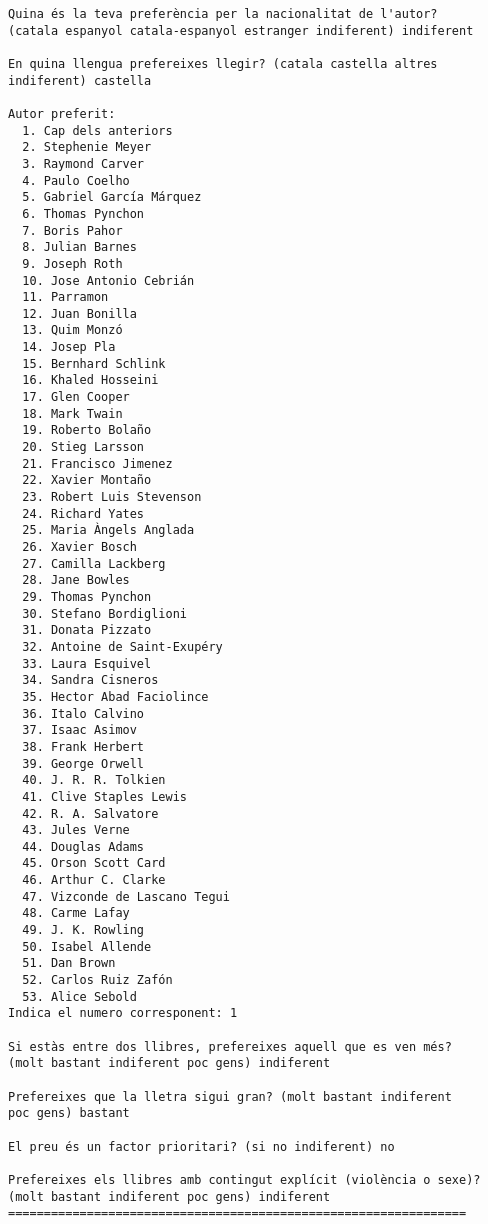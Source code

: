\begin{verbatim}
Quina és la teva preferència per la nacionalitat de l'autor?
(catala espanyol catala-espanyol estranger indiferent) indiferent

En quina llengua prefereixes llegir? (catala castella altres
indiferent) castella

Autor preferit: 
  1. Cap dels anteriors
  2. Stephenie Meyer
  3. Raymond Carver
  4. Paulo Coelho
  5. Gabriel García Márquez
  6. Thomas Pynchon
  7. Boris Pahor
  8. Julian Barnes
  9. Joseph Roth
  10. Jose Antonio Cebrián
  11. Parramon
  12. Juan Bonilla
  13. Quim Monzó
  14. Josep Pla
  15. Bernhard Schlink
  16. Khaled Hosseini
  17. Glen Cooper
  18. Mark Twain
  19. Roberto Bolaño
  20. Stieg Larsson
  21. Francisco Jimenez
  22. Xavier Montaño
  23. Robert Luis Stevenson
  24. Richard Yates
  25. Maria Àngels Anglada
  26. Xavier Bosch
  27. Camilla Lackberg
  28. Jane Bowles
  29. Thomas Pynchon
  30. Stefano Bordiglioni
  31. Donata Pizzato
  32. Antoine de Saint-Exupéry
  33. Laura Esquivel
  34. Sandra Cisneros
  35. Hector Abad Faciolince
  36. Italo Calvino
  37. Isaac Asimov
  38. Frank Herbert
  39. George Orwell
  40. J. R. R. Tolkien
  41. Clive Staples Lewis
  42. R. A. Salvatore
  43. Jules Verne
  44. Douglas Adams
  45. Orson Scott Card
  46. Arthur C. Clarke
  47. Vizconde de Lascano Tegui
  48. Carme Lafay
  49. J. K. Rowling
  50. Isabel Allende
  51. Dan Brown
  52. Carlos Ruiz Zafón
  53. Alice Sebold
Indica el numero corresponent: 1

Si estàs entre dos llibres, prefereixes aquell que es ven més?
(molt bastant indiferent poc gens) indiferent

Prefereixes que la lletra sigui gran? (molt bastant indiferent
poc gens) bastant

El preu és un factor prioritari? (si no indiferent) no

Prefereixes els llibres amb contingut explícit (violència o sexe)?
(molt bastant indiferent poc gens) indiferent
================================================================


\end{verbatim}
